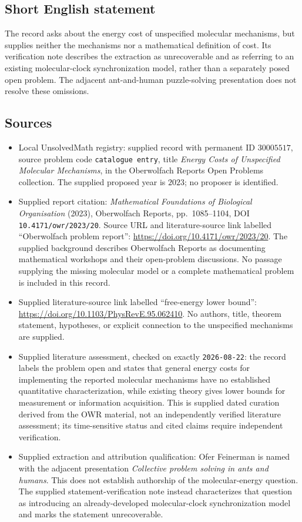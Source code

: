\documentclass[11pt]{article}
\begin{document}
\subsection{Short English statement}
The record asks about the energy cost of unspecified molecular mechanisms, but supplies neither the mechanisms nor a mathematical definition of cost. Its verification note describes the extraction as unrecoverable and as referring to an existing molecular-clock synchronization model, rather than a separately posed open problem. The adjacent ant-and-human puzzle-solving presentation does not resolve these omissions.
\subsection{Sources}
\begin{itemize}
\item Local UnsolvedMath registry: supplied record with permanent ID \(30005517\), source problem code \texttt{catalogue entry}, title \emph{Energy Costs of Unspecified Molecular Mechanisms}, in the Oberwolfach Reports Open Problems collection. The supplied proposed year is \(2023\); no proposer is identified.
\item Supplied report citation: \emph{Mathematical Foundations of Biological Organisation} (2023), Oberwolfach Reports, pp.~1085--1104, DOI \texttt{10.4171/owr/2023/20}. Source URL and literature-source link labelled ``Oberwolfach problem report'': \url{https://doi.org/10.4171/owr/2023/20}. The supplied background describes Oberwolfach Reports as documenting mathematical workshops and their open-problem discussions. No passage supplying the missing molecular model or a complete mathematical problem is included in this record.
\item Supplied literature-source link labelled ``free-energy lower bound'': \url{https://doi.org/10.1103/PhysRevE.95.062410}. No authors, title, theorem statement, hypotheses, or explicit connection to the unspecified mechanisms are supplied.
\item Supplied literature assessment, checked on exactly \texttt{2026-08-22}: the record labels the problem open and states that general energy costs for implementing the reported molecular mechanisms have no established quantitative characterization, while existing theory gives lower bounds for measurement or information acquisition. This is supplied dated curation derived from the OWR material, not an independently verified literature assessment; its time-sensitive status and cited claims require independent verification.
\item Supplied extraction and attribution qualification: Ofer Feinerman is named with the adjacent presentation \emph{Collective problem solving in ants and humans}. This does not establish authorship of the molecular-energy question. The supplied statement-verification note instead characterizes that question as introducing an already-developed molecular-clock synchronization model and marks the statement unrecoverable.
\end{itemize}
\end{document}
